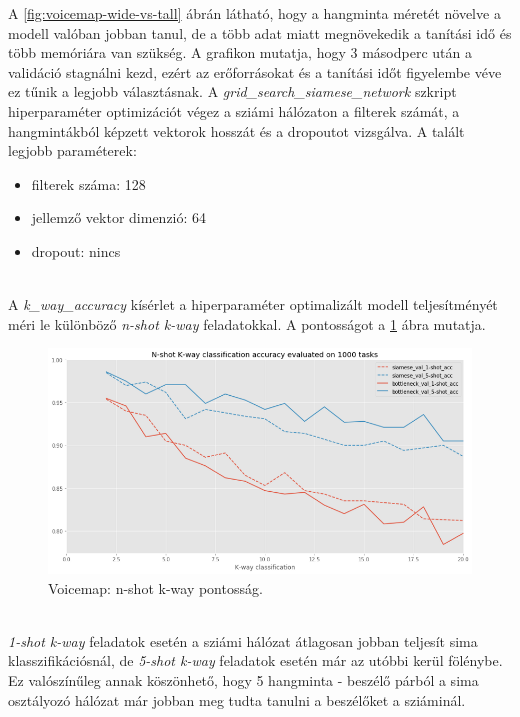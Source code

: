 A \ref{fig:voicemap-wide-vs-tall} ábrán látható, hogy a hangminta méretét növelve a modell valóban jobban tanul, de a több adat miatt megnövekedik a tanítási idő és több memóriára van szükség. A grafikon mutatja, hogy 3 másodperc után a validáció stagnálni kezd, ezért az erőforrásokat és a tanítási időt figyelembe véve ez tűnik a legjobb választásnak.
\newline
\newline
A \emph{grid\_search\_siamese\_network} szkript hiperparaméter optimizációt végez a sziámi hálózaton a filterek számát, a hangmintákból képzett vektorok hosszát és a dropoutot vizsgálva. A talált legjobb paraméterek:

\begin{itemize}
	\item filterek száma: 128
	\item jellemző vektor dimenzió: 64
	\item dropout: nincs
\end{itemize}
\ \\
A \emph{k\_way\_accuracy} kísérlet a hiperparaméter optimalizált modell teljesítményét méri le különböző \emph{n-shot k-way} feladatokkal. A pontosságot a \ref{fig:voicemap-n-shot-k-way} ábra mutatja.

\begin{figure}[!ht]
	\centering
	\includegraphics[width=150mm, keepaspectratio]{figures/voicemap-n-shot-k-way.png}
	\caption{Voicemap: n-shot k-way pontosság.}
	\label{fig:voicemap-n-shot-k-way}
\end{figure}
\ \\
\emph{1-shot k-way} feladatok esetén a sziámi hálózat átlagosan jobban teljesít sima klasszifikációsnál, de \emph{5-shot k-way} feladatok esetén már az utóbbi kerül fölénybe. Ez valószínűleg annak köszönhető, hogy 5 hangminta - beszélő párból a sima osztályozó hálózat már jobban meg tudta tanulni a beszélőket a sziáminál.


